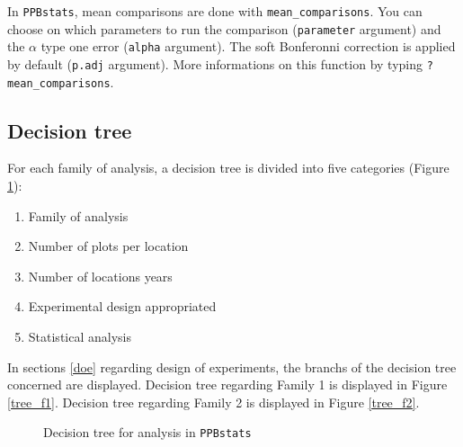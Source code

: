 \documentclass{book}\usepackage[]{graphicx}\usepackage[]{color}
\newcommand{\pack}{\texttt{PPBstats}}
\begin{document}
In \pack, mean comparisons are done with \texttt{mean\_comparisons}.
You can choose on which parameters to run the comparison (\texttt{parameter} argument) and the $\alpha$ type one error (\texttt{alpha} argument).
The soft Bonferonni correction is applied by default (\texttt{p.adj} argument).
More informations on this function by typing \texttt{?mean\_comparisons}.



\subsection{Decision tree}
\label{decision_tree}

For each family of analysis, a decision tree is divided into five categories (Figure \ref{tree}):
\begin{enumerate}
\item Family of analysis
\item Number of plots per location
\item Number of locations years
\item Experimental design appropriated
\item Statistical analysis
\end{enumerate}

In sections \ref{doe} regarding design of experiments, the branchs of the decision tree concerned are displayed. 
Decision tree regarding Family 1 is displayed in Figure \ref{tree_f1}.
Decision tree regarding Family 2 is displayed in Figure \ref{tree_f2}.

\begin{figure}[H]
\begin{center}
\caption{Decision tree for analysis in \pack}
\label{tree}
\end{center}
\end{figure}
\end{document}
